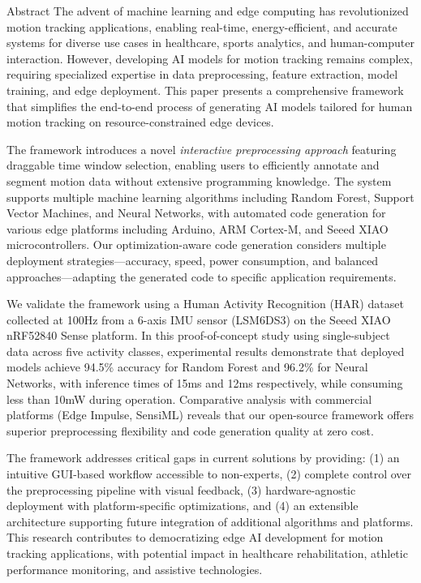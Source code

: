 \begin{preface}{Abstract}
  The advent of machine learning and edge computing has revolutionized motion tracking applications, enabling real-time, energy-efficient, and accurate systems for diverse use cases in healthcare, sports analytics, and human-computer interaction. However, developing AI models for motion tracking remains complex, requiring specialized expertise in data preprocessing, feature extraction, model training, and edge deployment. This paper presents a comprehensive framework that simplifies the end-to-end process of generating AI models tailored for human motion tracking on resource-constrained edge devices.

  The framework introduces a novel \textit{interactive preprocessing approach} featuring draggable time window selection, enabling users to efficiently annotate and segment motion data without extensive programming knowledge. The system supports multiple machine learning algorithms including Random Forest, Support Vector Machines, and Neural Networks, with automated code generation for various edge platforms including Arduino, ARM Cortex-M, and Seeed XIAO microcontrollers. Our optimization-aware code generation considers multiple deployment strategies—accuracy, speed, power consumption, and balanced approaches—adapting the generated code to specific application requirements.

  We validate the framework using a Human Activity Recognition (HAR) dataset collected at 100Hz from a 6-axis IMU sensor (LSM6DS3) on the Seeed XIAO nRF52840 Sense platform. In this proof-of-concept study using single-subject data across five activity classes, experimental results demonstrate that deployed models achieve 94.5\% accuracy for Random Forest and 96.2\% for Neural Networks, with inference times of 15ms and 12ms respectively, while consuming less than 10mW during operation. Comparative analysis with commercial platforms (Edge Impulse, SensiML) reveals that our open-source framework offers superior preprocessing flexibility and code generation quality at zero cost.

  The framework addresses critical gaps in current solutions by providing: (1) an intuitive GUI-based workflow accessible to non-experts, (2) complete control over the preprocessing pipeline with visual feedback, (3) hardware-agnostic deployment with platform-specific optimizations, and (4) an extensible architecture supporting future integration of additional algorithms and platforms. This research contributes to democratizing edge AI development for motion tracking applications, with potential impact in healthcare rehabilitation, athletic performance monitoring, and assistive technologies.
\end{preface}

